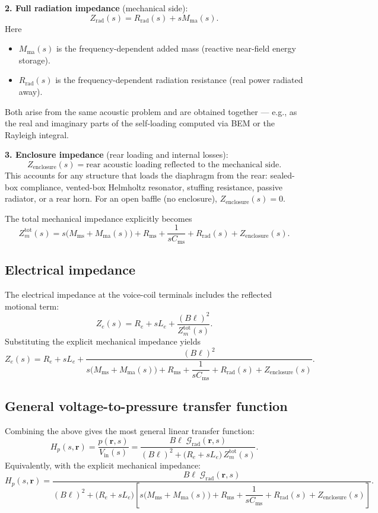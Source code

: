 \noindent
\textbf{2. Full radiation impedance} (mechanical side):
\[
\boxed{Z_{\mathrm{rad}}(s)=R_{\mathrm{rad}}(s)+sM_{\mathrm{ma}}(s)}.
\]
Here
\begin{itemize}
  \item \(M_{\mathrm{ma}}(s)\) is the frequency-dependent added mass (reactive near-field energy storage).
  \item \(R_{\mathrm{rad}}(s)\) is the frequency-dependent radiation resistance (real power radiated away).
\end{itemize}
Both arise from the same acoustic problem and are obtained together — e.g., as the real and imaginary parts of the self‑loading computed via BEM or the Rayleigh integral.

\noindent
\textbf{3. Enclosure impedance} (rear loading and internal losses):
\[
\boxed{Z_{\mathrm{enclosure}}(s)=\text{rear acoustic loading reflected to the mechanical side}}.
\]
This accounts for any structure that loads the diaphragm from the rear: sealed-box compliance, vented-box Helmholtz resonator, stuffing resistance, passive radiator, or a rear horn. For an open baffle (no enclosure), \(Z_{\mathrm{enclosure}}(s)=0\).

The total mechanical impedance explicitly becomes
\[
Z_m^{\mathrm{tot}}(s)=
s\bigl(M_{\mathrm{ms}}+M_{\mathrm{ma}}(s)\bigr)
+R_{\mathrm{ms}}
+\frac{1}{sC_{\mathrm{ms}}}
+R_{\mathrm{rad}}(s)
+Z_{\mathrm{enclosure}}(s).
\]

\subsection{Electrical impedance}

The electrical impedance at the voice-coil terminals includes the reflected motional term:
\[
\boxed{Z_e(s)=R_e+sL_e+\frac{(B\ell)^2}{Z_m^{\mathrm{tot}}(s)}}.
\]
Substituting the explicit mechanical impedance yields
\[
\boxed{
Z_e(s)=R_e+sL_e+
\frac{(B\ell)^2}{
s\bigl(M_{\mathrm{ms}}+M_{\mathrm{ma}}(s)\bigr)
+R_{\mathrm{ms}}
+\dfrac{1}{sC_{\mathrm{ms}}}
+R_{\mathrm{rad}}(s)
+Z_{\mathrm{enclosure}}(s)
}.
}
\]

\subsection{General voltage-to-pressure transfer function}

Combining the above gives the most general linear transfer function:
\[
\boxed{
H_p(s,\mathbf{r})=
\frac{p(\mathbf{r},s)}{V_{\mathrm{in}}(s)}
=
\frac{B\ell\;\mathcal{G}_{\mathrm{rad}}(\mathbf{r},s)}
{(B\ell)^2+\bigl(R_e+sL_e\bigr)\,Z_m^{\mathrm{tot}}(s)}
}.
\]
Equivalently, with the explicit mechanical impedance:
\[
\boxed{
H_p(s,\mathbf{r})=
\frac{B\ell\;\mathcal{G}_{\mathrm{rad}}(\mathbf{r},s)}
{(B\ell)^2+\bigl(R_e+sL_e\bigr)
\left[
s\bigl(M_{\mathrm{ms}}+M_{\mathrm{ma}}(s)\bigr)
+R_{\mathrm{ms}}
+\dfrac{1}{sC_{\mathrm{ms}}}
+R_{\mathrm{rad}}(s)
+Z_{\mathrm{enclosure}}(s)
\right]
}.
}
\]

